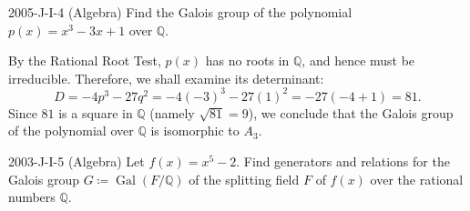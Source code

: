 \documentclass{article}
\begin{document}
\begin{prb}{2005-J-I-4 (Algebra)}
	Find the Galois group of the polynomial $p(x) = x^{3} - 3x + 1$ over $\mathbb{Q}$. 
\end{prb}
\begin{solutions}
	By the Rational Root Test, $p(x)$ has no roots in $\mathbb{Q}$, and hence must be irreducible. Therefore, we shall examine its determinant: 
		\begin{equation}
			D = -4p^{3} - 27q^{2} = -4(-3)^{3} - 27(1)^{2} = -27(-4 + 1) = 81. 
		\end{equation}
	Since $81$ is a square in $\mathbb{Q}$ (namely $\sqrt{81} = 9$), we conclude that the Galois group of the polynomial over $\mathbb{Q}$ is isomorphic to $A_{3}$. 
\end{solutions}
\begin{prb}{2003-J-I-5 (Algebra)}
	Let $f(x) = x^{5} - 2$. Find generators and relations for the Galois group $G \coloneqq \operatorname{Gal}(F/\mathbb{Q})$ of the splitting field $F$ of $f(x)$ over the rational numbers $\mathbb{Q}$. 
\end{prb}
\end{document}
